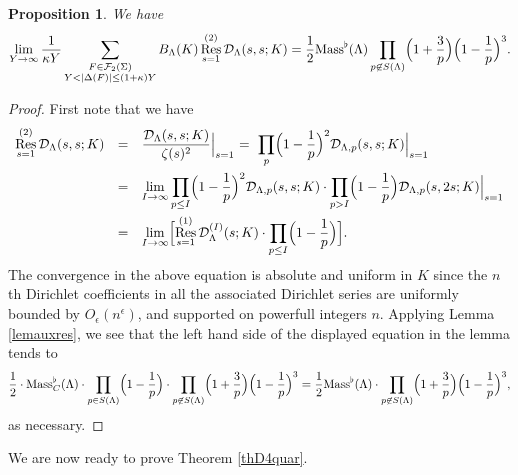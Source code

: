 \documentclass[10pt]{article}
\theoremstyle{plain}
\newtheorem{prop}[thm]{Proposition}
\theoremstyle{definition}
\theoremstyle{remark}
\DeclareMathOperator{\Res}{Res}
\def\Mass{{\rm Mass}}
\def\FF{{\mathcal F}}
\def\cD{{\mathcal D}}
\begin{document}
\begin{prop}\label{propConstant}
We have
\begin{equation*}
\lim_{Y\to\infty}\frac{1}{\kappa Y}\sum_{\substack{F\in\FF_2(\Sigma)\\Y<|\Delta(F)|\leq
    (1+\kappa)Y}} B_\Lambda(K) \Res^{(2)}_{s=1}\cD_\Lambda(s,s;K)=
\frac12\Mass^\flat(\Lambda) \prod_{p\not\in
  S(\Lambda)}\Bigl(1+\frac{3}{p}\Bigr)\Bigl(1-\frac{1}{p}\Bigr)^3.
\end{equation*}
\end{prop}
\begin{proof}
First note that we have
\begin{equation*}
\begin{array}{rcl}
\displaystyle\Res_{s=1}^{(2)}\cD_\Lambda(s,s;K)&=&\displaystyle
\frac{\cD_\Lambda(s,s;K)}{\zeta(s)^2}\Bigl|_{s=1}
\, \, =\, \, \displaystyle
\prod_{p}\Bigl(1-\frac{1}{p}\Bigr)^2\cD_{\Lambda,p}(s,s;K)\Bigl|_{s=1}
\\[.2in]&=&\displaystyle
\lim_{I\to\infty}\prod_{p\leq I}\Bigl(1-\frac{1}{p}\Bigr)^2\cD_{\Lambda,p}(s,s;K)
\cdot\prod_{p>I}\Bigl(1-\frac{1}{p}\Bigr)\cD_{\Lambda,p}(s,2s;K)\Bigl|_{s=1}
\\[.2in]&=&\displaystyle
\lim_{I\to\infty}\Bigl[\Res_{s=1}^{(1)}\cD^{(I)}_\Lambda(s;K)\cdot
\prod_{p\leq I}\Bigl(1-\frac{1}{p}\Bigr)\Bigr].
\end{array}
\end{equation*}
The convergence in the above equation is absolute and uniform in $K$
since the $n$th Dirichlet coefficients in all the associated Dirichlet
series are uniformly bounded by $O_\epsilon(n^\epsilon)$, and
supported on powerfull integers $n$. Applying Lemma \ref{lemauxres},
we see that the left hand side of the displayed equation in the lemma
tends to
\begin{equation*}
\frac12\cdot
\Mass^\flat_C(\Lambda)\cdot\prod_{p\in S(\Lambda)}
\Bigl(1-\frac{1}{p}\Bigr)\cdot
\prod_{p\not\in S(\Lambda)}
\Bigl(1+\frac{3}{p}\Bigr)\Bigl(1-\frac{1}{p}\Bigr)^3
=
\frac12\Mass^\flat(\Lambda)\cdot
\prod_{p\not\in S(\Lambda)}
\Bigl(1+\frac{3}{p}\Bigr)\Bigl(1-\frac{1}{p}\Bigr)^3,
\end{equation*}
as necessary.
\end{proof}

We are now ready to prove Theorem \ref{thD4quar}.

\medskip
\end{document}
